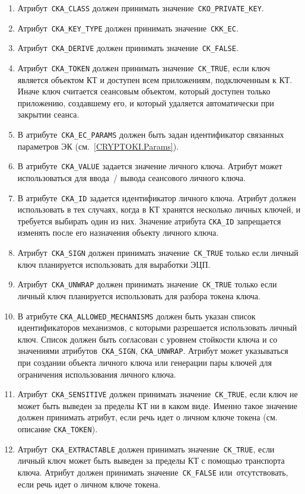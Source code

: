 \begin{enumerate}
\item
Атрибут~\verb|CKA_CLASS| должен принимать значение~\verb|CKO_PRIVATE_KEY|.

\item
Атрибут~\verb|CKA_KEY_TYPE| должен принимать значение~\verb|CKK_EC|.

\item
Атрибут~\verb|CKA_DERIVE| должен принимать значение~\verb|CK_FALSE|.

\item
Атрибут~\verb|CKA_TOKEN| должен принимать значение~\verb|CK_TRUE|,
если ключ является объектом КТ и доступен всем приложениям,
подключенным к КТ. 
%
Иначе ключ считается сеансовым объектом, который доступен только
приложению, создавшему его, и который удаляется автоматически при закрытии 
сеанса.

\item
В атрибуте~\verb|CKA_EC_PARAMS| должен быть задан идентификатор связанных
параметров ЭК (см.~\ref{CRYPTOKI.Params}).

\item
В атрибуте~\verb|CKA_VALUE| задается значение личного ключа.
Атрибут может использоваться для ввода~/ вывода сеансового личного ключа.

\item
В атрибуте~\verb|CKA_ID| задается идентификатор личного ключа.
Атрибут должен использовать в тех случаях, когда в КТ
хранятся несколько личных ключей, и требуется выбирать один из них. 
%
Значение атрибута \verb|CKA_ID| запрещается изменять
после его назначения объекту личного ключа.

\item
Атрибут~\verb|CKA_SIGN| должен принимать значение~\verb|CK_TRUE|
только если личный ключ планируется использовать для выработки ЭЦП.

\item
Атрибут~\verb|CKA_UNWRAP| должен принимать значение~\verb|CK_TRUE|
только если личный ключ планируется использовать для разбора
токена ключа.

\item
В атрибуте \verb|CKA_ALLOWED_MECHANISMS| должен быть указан список 
идентификаторов механизмов, с которыми разрешается использовать личный 
ключ. Список должен быть согласован с уровнем стойкости ключа и со 
значениями атрибутов~\verb|CKA_SIGN|, \verb|CKA_UNWRAP|. 
%
Атрибут может указываться при создании объекта личного ключа 
или генерации пары ключей для ограничения использования личного ключа. 

\item
Атрибут~\verb|CKA_SENSITIVE| должен принимать значение~\verb|CK_TRUE|,
если ключ не может быть выведен за пределы КТ ни в каком виде.
%
Именно такое значение должен принимать атрибут,
если речь идет о личном ключе токена (см. описание \verb|CKA_TOKEN|). 

\item
Атрибут~\verb|CKA_EXTRACTABLE| должен принимать значение~\verb|CK_TRUE|,
если личный ключ может быть выведен за пределы КТ с помощью транспорта 
ключа. 
%
Атрибут должен принимать значение~\verb|CK_FALSE| или~отсутствовать, если 
речь идет о личном ключе токена.
\end{enumerate}

